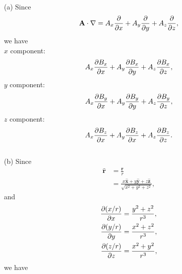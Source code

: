             \begin{sol}[1.22]~\\
                (a) Since 
                \begin{equation}
                    \mathbf{A} \cdot\nabla=A_x\frac{\partial }{\partial x} + A_y\frac{\partial }{\partial y} + A_z\frac{\partial }{\partial z},
                \end{equation}
                we have\\
                $x$ component: \\
                    \begin{equation}
                        A_x\frac{\partial B_x}{\partial x} + A_y\frac{\partial B_x}{\partial y} + A_z\frac{\partial B_x}{\partial z},
                    \end{equation}
                $y$ component:\\
                \begin{equation}
                    A_x\frac{\partial B_y}{\partial x} + A_y\frac{\partial B_y}{\partial y} + A_z\frac{\partial B_y}{\partial z},
                \end{equation}
                $z$ component:\\
                \begin{equation}
                    A_x\frac{\partial B_z}{\partial x} + A_y\frac{\partial B_z}{\partial x} + A_z\frac{\partial B_z}{\partial z}.
                \end{equation}\\
                \noindent (b) Since 
                \begin{equation}
                    \begin{aligned}
                        \mathbf{\hat{r}} &= \frac{\mathbf{r}}{r}\\
                        &=\frac{x\mathbf{\hat{x}} + y\mathbf{\hat{y}} + z\mathbf{\hat{z}}}{\sqrt{x^2 + y^2 + z^2}},
                    \end{aligned}
                \end{equation}
                and\\
                \begin{equation}
                    \begin{aligned}
                        \frac{\partial (x/r)}{\partial x} &= \frac{y^2+z^2}{r^3}, \\
                        \frac{\partial (y/r)}{\partial y} &= \frac{x^2+z^2}{r^3}, \\
                        \frac{\partial (z/r)}{\partial z} &= \frac{x^2+y^2}{r^3},
                    \end{aligned}
                \end{equation}
                    we have

\end{sol}
